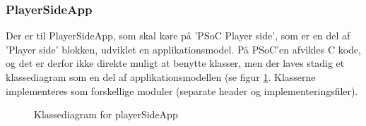 \documentclass[Arkitektur/System_main.tex]{subfiles}
\begin{document}
\subsubsection{PlayerSideApp}
Der er til PlayerSideApp, som skal køre på 'PSoC Player side', som er en del af 'Player side' blokken, udviklet en applikationsmodel. På PSoC'en afvikles C kode, og det er derfor ikke direkte muligt at benytte klasser, men der laves stadig et klassediagram som en del af applikationsmodellen (se figur \ref{fig:CD_PlayerSide}. Klasserne implementeres som forskellige moduler (separate header og implementeringsfiler).

\begin{figure}[H]
    \centering
    \centering
    \caption{Klassediagram for playerSideApp}
    \label{fig:CD_PlayerSide}
\end{figure}
\end{document}
